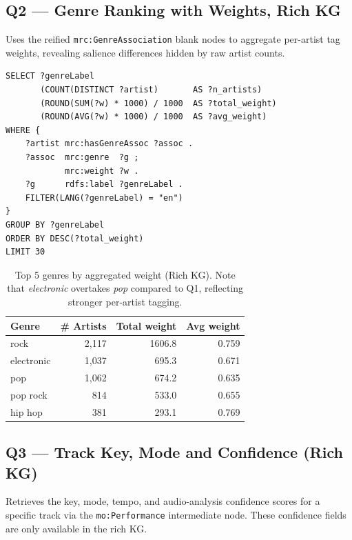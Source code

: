 \subsection*{Q2 — Genre Ranking with Weights, Rich KG}

Uses the reified \texttt{mrc:GenreAssociation} blank nodes to aggregate per-artist tag weights, revealing salience differences hidden by raw artist counts.

\begin{footnotesize}
\begin{verbatim}
SELECT ?genreLabel
       (COUNT(DISTINCT ?artist)       AS ?n_artists)
       (ROUND(SUM(?w) * 1000) / 1000  AS ?total_weight)
       (ROUND(AVG(?w) * 1000) / 1000  AS ?avg_weight)
WHERE {
    ?artist mrc:hasGenreAssoc ?assoc .
    ?assoc  mrc:genre  ?g ;
            mrc:weight ?w .
    ?g      rdfs:label ?genreLabel .
    FILTER(LANG(?genreLabel) = "en")
}
GROUP BY ?genreLabel
ORDER BY DESC(?total_weight)
LIMIT 30
\end{verbatim}
\end{footnotesize}

\begin{table}[H]
\centering\footnotesize
\caption{Top 5 genres by aggregated weight (Rich KG). Note that \textit{electronic} overtakes \textit{pop} compared to Q1, reflecting stronger per-artist tagging.}
\begin{tabular}{lrrr}
\toprule
Genre & \# Artists & Total weight & Avg weight \\ \midrule
rock       & 2{,}117 & 1606.8 & 0.759 \\
electronic & 1{,}037 &  695.3 & 0.671 \\
pop        & 1{,}062 &  674.2 & 0.635 \\
pop rock   &   814   &  533.0 & 0.655 \\
hip hop    &   381   &  293.1 & 0.769 \\
\bottomrule
\end{tabular}
\end{table}

\subsection*{Q3 — Track Key, Mode and Confidence (Rich KG)}

Retrieves the key, mode, tempo, and audio-analysis confidence scores for a specific track via the \texttt{mo:Performance} intermediate node. These confidence fields are only available in the rich KG.

